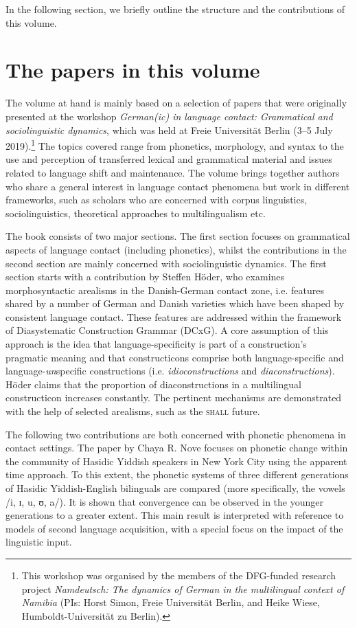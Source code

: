 \documentclass[output=paper]{langsci/langscibook}
\begin{document}
In the following section, we briefly outline the structure and the contributions of this volume. 

\section{The papers in this volume} %
\label{sec:zimmer:2}

The volume at hand is mainly based on a selection of papers that were originally presented at the workshop \textit{German(ic) in language contact: Grammatical and sociolinguistic dynamics}, which was held at Freie Universität Berlin (3--5 July 2019).\footnote{This workshop was organised by the members of the DFG-funded research project \textit{Namdeutsch: The dynamics of German in the multilingual context of Namibia} (PIs: Horst Simon, Freie Universität Berlin, and Heike Wiese, Humboldt-Universität zu Berlin).}  The topics covered range from phonetics, morphology, and syntax to the use and perception of transferred lexical and grammatical material and issues related to language shift and maintenance. The volume brings together authors who share a general interest in language contact phenomena but work in different frameworks, such as scholars who are concerned with corpus linguistics, sociolinguistics, theoretical approaches to multilingualism etc. 

The book consists of two major sections. The first section focuses on grammatical aspects of language contact (including phonetics), whilst the contributions in the second section are mainly concerned with sociolinguistic dynamics. The first section starts with a contribution by {Steffen} {Höder,} who examines morphosyntactic arealisms in the Danish-German contact zone, i.e. features shared by a number of German and Danish varieties which have been shaped by consistent language contact. These features are addressed within the framework of Diasystematic Construction Grammar (DCxG). A core assumption of this approach is the idea that language-specificity is part of a construction’s pragmatic meaning and that constructicons comprise both language-specific and language-\textit{un}specific constructions (i.e. \textit{idioconstructions} and \textit{diaconstructions}). Höder claims that the proportion of diaconstructions in a multilingual constructicon increases constantly. The pertinent mechanisms are demonstrated with the help of selected arealisms, such as the \textsc{shall} future. 

The following two contributions are both concerned with phonetic phenomena in contact settings. The paper by {Chaya} {R.} {Nove} focuses on phonetic change within the community of Hasidic Yiddish speakers in New York City using the apparent time approach. To this extent, the phonetic systems of three different generations of Hasidic Yiddish-English bilinguals are compared (more specifically, the vowels /i, ɪ, u, ʊ, a/). It is shown that convergence can be observed in the younger generations to a greater extent. This main result is interpreted with reference to models of second language acquisition, with a special focus on the impact of the linguistic input.
\end{document}
